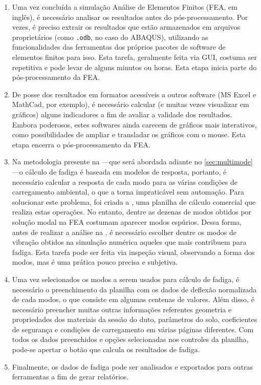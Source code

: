 \begin{enumerate}[label= (\arabic*)]
    \item Uma vez concluída a simulação Análise de Elementos Finitos (FEA, em inglês), é necessário analisar os resultados antes do pós-processamento. Por vezes, é preciso extrair os resultados que estão armazenados em arquivos proprietários (como \texttt{.odb}, no caso do ABAQUS), utilizando as funcionalidades das ferramentas dos próprios pacotes de software de elementos finitos para isso. Esta tarefa, geralmente feita via GUI, costuma ser repetitiva e pode levar de alguns minutos ou horas. Esta etapa inicia parte do pós-processamento da FEA\@.
    \item De posse dos resultados em formatos acessíveis a outros software (MS Excel e MathCad, por exemplo), é necessário calcular (e muitas vezes visualizar em gráficos) alguns indicadores a fim de avaliar a validade dos resultados. Embora poderosos, estes softwares ainda carecem de gráficos mais interativos, como possibilidades de ampliar e transladar os gráficos com o mouse. Esta etapa encerra o pós-processamento da FEA\@.
    \item Na metodologia presente na ---que será abordada adiante no \autoref{sec:multimode}---o cálculo de fadiga é baseada em modelos de resposta, portanto, é necessário calcular a resposta de cada modo para as várias condições de carregamento ambiental, o que a torna impraticável sem automação. Para solucionar este problema, foi criada a \fatfree, uma planilha de cálculo comercial que realiza estas operações. No entanto, dentre as dezenas de modos obtidos por solução modal na FEA costumam aparecer modos espúrios. Dessa forma, antes de realizar a análise na \fatfree, é necessário escolher dentre os modos de vibração obtidos na simulação numérica aqueles que mais contribuem para fadiga. Esta tarefa pode ser feita via inspeção visual, observando a forma dos modos, mas é uma prática pouco precisa e subjetiva.
    \item Uma vez selecionados os modos a serem usados para cálculo de fadiga, é necessário o preenchimento da planilha com os dados de deflexão normalizada de cada modos, o que consiste em algumas centenas de valores. Além disso, é necessário preencher muitas outras informações referentes geometria e propriedades dos materiais da sessão do duto, parâmetros do solo, coeficientes de segurança e condições de carregamento em várias páginas diferentes. Com todos os dados preenchidos e opções selecionadas nos controles da planilha, pode-se apertar o botão que calcula os resultados de fadiga.
    \item Finalmente, os dados de fadiga pode ser analisados e exportados para outras ferramentas a fim de gerar relatórios.
\end{enumerate}